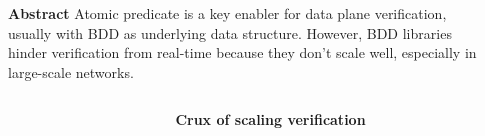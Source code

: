 \documentclass[final]{beamer}
\newlength{\sepwidthB}
\newlength{\colwidthB}
\newcommand{\separatorcolumnB}{\begin{column}{\sepwidthB}\end{column}}
\begin{document}
\begin{frame}[t]
\begin{columns}[t]
  \begin{column}{0.53\paperwidth}
    \begin{block}{\Large{\textbf{Abstract}}}
      \large
      Atomic predicate is a key enabler for data plane verification, usually with
      BDD as underlying data structure. However, BDD libraries hinder verification
      from real-time because they don't scale well, especially in large-scale networks.

    \end{block}
  \end{column}
  \begin{column}{0.39\paperwidth}


  \end{column}
\end{columns}

\begin{columns}
\separatorcolumnB
  \begin{column}[T]{\colwidthB}
    \begin{block}{\Large{\textbf{Crux of scaling verification}}}
    \vspace{0.5cm}
    \large


\end{block}
\end{column}
\end{columns}
\end{frame}
\end{document}
